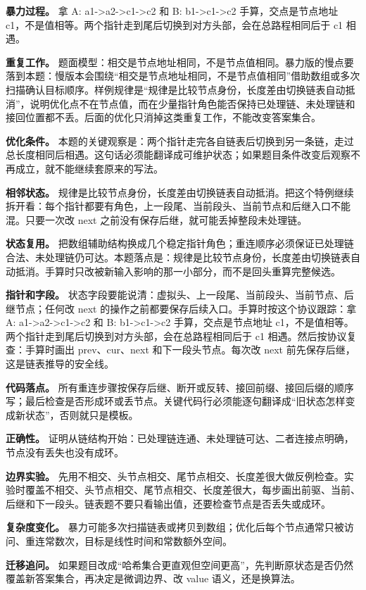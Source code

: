 \textbf{暴力过程。} 拿 A: a1->a2->c1->c2 和 B: b1->c1->c2 手算，交点是节点地址 c1，不是值相等。两个指针走到尾后切换到对方头部，会在总路程相同后于 c1 相遇。

\textbf{重复工作。} 题面模型：相交是节点地址相同，不是节点值相同。暴力版的慢点要落到本题：慢版本会围绕“相交是节点地址相同，不是节点值相同”借助数组或多次扫描确认目标顺序。样例规律是“规律是比较节点身份，长度差由切换链表自动抵消”，说明优化点不在节点值，而在少量指针角色能否保持已处理链、未处理链和接回位置都不丢。后面的优化只消掉这类重复工作，不能改变答案集合。

\textbf{优化条件。} 本题的关键观察是：两个指针走完各自链表后切换到另一条链，走过总长度相同后相遇。这句话必须能翻译成可维护状态；如果题目条件改变后观察不再成立，就不能继续套原来的写法。

\textbf{相邻状态。} 规律是比较节点身份，长度差由切换链表自动抵消。把这个特例继续拆开看：每个指针都要有角色，上一段尾、当前段头、当前节点和后继入口不能混。只要一次改 next 之前没有保存后继，就可能丢掉整段未处理链。

\textbf{状态复用。} 把数组辅助结构换成几个稳定指针角色；重连顺序必须保证已处理链合法、未处理链仍可达。本题落点是：规律是比较节点身份，长度差由切换链表自动抵消。手算时只改被新输入影响的那一小部分，而不是回头重算完整候选。

\textbf{指针和字段。} 状态字段要能说清：虚拟头、上一段尾、当前段头、当前节点、后继节点；任何改 next 的操作之前都要保存后续入口。手算时按这个协议跟踪：拿 A: a1->a2->c1->c2 和 B: b1->c1->c2 手算，交点是节点地址 c1，不是值相等。两个指针走到尾后切换到对方头部，会在总路程相同后于 c1 相遇。然后按协议复查：手算时画出 prev、cur、next 和下一段头节点。每次改 next 前先保存后继，这是链表推导的安全线。

\textbf{代码落点。} 所有重连步骤按保存后继、断开或反转、接回前缀、接回后缀的顺序写；最后检查是否形成环或丢节点。关键代码行必须能逐句翻译成“旧状态怎样变成新状态”，否则就只是模板。

\textbf{正确性。} 证明从链结构开始：已处理链连通、未处理链可达、二者连接点明确，节点没有丢失也没有成环。

\textbf{边界实验。} 先用不相交、头节点相交、尾节点相交、长度差很大做反例检查。实验时覆盖不相交、头节点相交、尾节点相交、长度差很大，每步画出前驱、当前、后继和下一段头。链表题不要只看输出值，还要检查节点是否丢失或成环。

\textbf{复杂度变化。} 暴力可能多次扫描链表或拷贝到数组；优化后每个节点通常只被访问、重连常数次，目标是线性时间和常数额外空间。

\textbf{迁移追问。} 如果题目改成“哈希集合更直观但空间更高”，先判断原状态是否仍然覆盖新答案集合，再决定是微调边界、改 value 语义，还是换算法。

